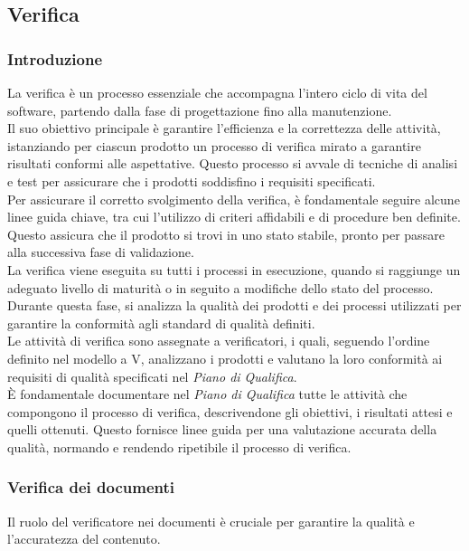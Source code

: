 \subsection{Verifica}
\label{subsec:verifica}

\subsubsection{Introduzione}
La verifica è un processo essenziale che accompagna l'intero ciclo di vita del software, partendo dalla fase di progettazione fino alla manutenzione. \\
Il suo obiettivo principale è garantire l'efficienza e la correttezza delle attività, istanziando per ciascun prodotto un processo di verifica mirato a garantire risultati conformi alle aspettative. Questo processo si avvale di tecniche di analisi e test per assicurare che i prodotti soddisfino i requisiti specificati. \\
Per assicurare il corretto svolgimento della verifica, è fondamentale seguire alcune linee guida chiave, tra cui l'utilizzo di criteri affidabili e di procedure ben definite. Questo assicura che il prodotto si trovi in uno stato stabile, pronto per passare alla successiva fase di validazione. \\
La verifica viene eseguita su tutti i processi in esecuzione, quando si raggiunge un adeguato livello di maturità o in seguito a modifiche dello stato del processo. Durante questa fase, si analizza la qualità dei prodotti e dei processi utilizzati per garantire la conformità agli standard di qualità definiti. \\
Le attività di verifica sono assegnate a verificatori, i quali, seguendo l'ordine definito nel modello a V, analizzano i prodotti e valutano la loro conformità ai requisiti di qualità specificati nel \textit{Piano di Qualifica}. \\ 
È fondamentale documentare nel \textit{Piano di Qualifica} tutte le attività che compongono il processo di verifica, descrivendone gli obiettivi, i risultati attesi e quelli ottenuti. Questo fornisce linee guida per una valutazione accurata della qualità, normando e rendendo ripetibile il processo di verifica.

\subsubsection{Verifica dei documenti}
\label{sec:verificatori}

Il ruolo del verificatore nei documenti è cruciale per garantire la qualità e l'accuratezza del contenuto. 

